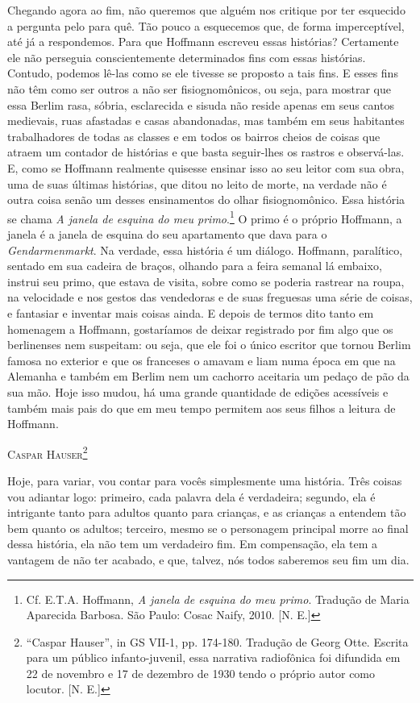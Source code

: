 Chegando agora ao fim, não queremos que alguém nos critique por ter
esquecido a pergunta pelo para quê. Tão pouco a esquecemos que, de forma
imperceptível, até já a respondemos. Para que Hoffmann escreveu essas
histórias? Certamente ele não perseguia conscientemente determinados
fins com essas histórias. Contudo, podemos lê-las como se ele tivesse se
proposto a tais fins. E esses fins não têm como ser outros a não ser
fisiognomônicos, ou seja, para mostrar que essa Berlim rasa, sóbria,
esclarecida e sisuda não reside apenas em seus cantos medievais, ruas
afastadas e casas abandonadas, mas também em seus habitantes
trabalhadores de todas as classes e em todos os bairros cheios de coisas
que atraem um contador de histórias e que basta seguir-lhes os rastros e
observá-las. E, como se Hoffmann realmente quisesse ensinar isso ao seu
leitor com sua obra, uma de suas últimas histórias, que ditou no leito
de morte, na verdade não é outra coisa senão um desses ensinamentos do
olhar fisiognomônico. Essa história se chama \emph{A janela de esquina
do meu primo}.\footnote{Cf. E.T.A. Hoffmann, \emph{A janela de esquina
  do meu primo}. Tradução de Maria Aparecida Barbosa. São Paulo: Cosac
  Naify, 2010. {[}N. E.{]}} O primo é o próprio Hoffmann, a janela é a
janela de esquina do seu apartamento que dava para o
\emph{Gendarmenmarkt}. Na verdade, essa história é um diálogo. Hoffmann,
paralítico, sentado em sua cadeira de braços, olhando para a feira
semanal lá embaixo, instrui seu primo, que estava de visita, sobre como
se poderia rastrear na roupa, na velocidade e nos gestos das vendedoras
e de suas freguesas uma série de coisas, e fantasiar e inventar mais
coisas ainda. E depois de termos dito tanto em homenagem a Hoffmann,
gostaríamos de deixar registrado por fim algo que os berlinenses nem
suspeitam: ou seja, que ele foi o único escritor que tornou Berlim
famosa no exterior e que os franceses o amavam e liam numa época em que
na Alemanha e também em Berlim nem um cachorro aceitaria um pedaço de
pão da sua mão. Hoje isso mudou, há uma grande quantidade de edições
acessíveis e também mais pais do que em meu tempo permitem aos seus
filhos a leitura de Hoffmann.

\textsc{Caspar Hauser}\footnote{``Caspar Hauser'', in GS VII-1, pp.
  174-180. Tradução de Georg Otte. Escrita para um público
  infanto-juvenil, essa narrativa radiofônica foi difundida em 22 de
  novembro e 17 de dezembro de 1930 tendo o próprio autor como locutor.
  {[}N. E.{]}}

Hoje, para variar, vou contar para vocês simplesmente uma história. Três
coisas vou adiantar logo: primeiro, cada palavra dela é verdadeira;
segundo, ela é intrigante tanto para adultos quanto para crianças, e as
crianças a entendem tão bem quanto os adultos; terceiro, mesmo se o
personagem principal morre ao final dessa história, ela não tem um
verdadeiro fim. Em compensação, ela tem a vantagem de não ter acabado, e
que, talvez, nós todos saberemos seu fim um dia.

